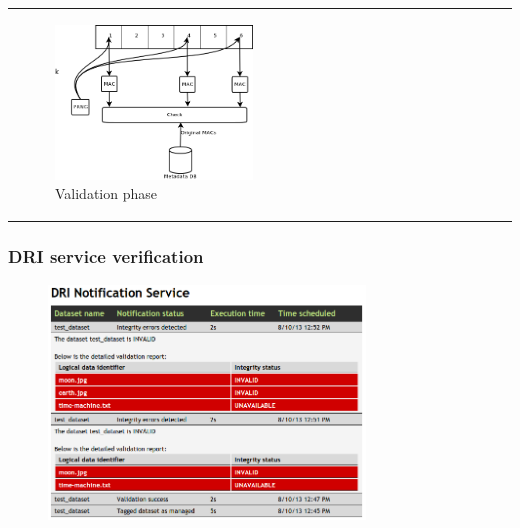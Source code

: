 \documentclass[9pt]{beamer}
\begin{document}
\begin{frame}
\begin{tabular}{l l}
\begin{minipage}{0.6\textwidth}
	\begin{figure}
		\centering
		\includegraphics[width=0.5\textwidth]{img/algorithm-validation.png}
		\caption{Validation phase}
	\end{figure}
	\end{minipage}
\end{tabular}
\end{frame}


\begin{frame}
\frametitle{\hspace{5mm} \textbf{DRI service verification}}
	\begin{figure}
		\centering
		\includegraphics[width=0.75\textwidth]{img/test-scenario-results.png}
	\end{figure}
\end{frame}

\end{document}
